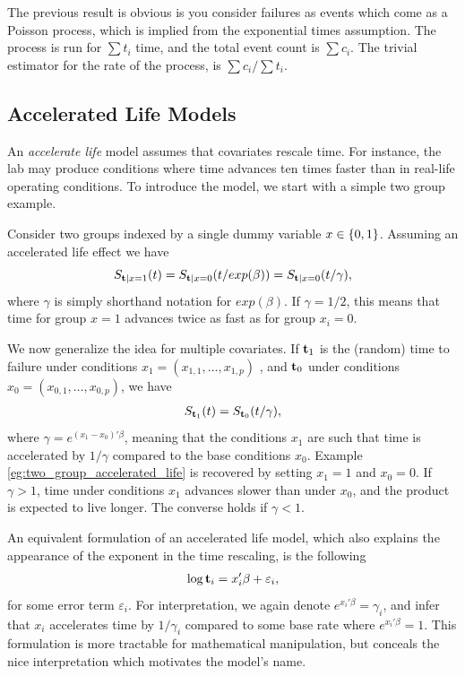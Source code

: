 \begin{extra}
The previous result is obvious is you consider failures as events which come as a Poisson process, which is implied from the exponential times assumption. 
The process is run for $\sum t_i$ time, and the total event count is $\sum c_i$. 
The trivial estimator for the rate of the process, is $\sum c_i/\sum t_i$.
\end{extra}






\subsection{Accelerated Life Models}
An \emph{accelerate life} model assumes that covariates rescale time. 
For instance, the lab may produce conditions where time advances ten times faster than in real-life operating conditions.
To introduce the model, we start with a simple two group example.
\begin{example}
\label{eg:two_group_accelerated_life}
Consider two groups indexed by a single dummy variable $x \in \{ 0,1 \}$.
Assuming an accelerated life effect we have
$$
	S_{\mathbf{t}|x=1} (t) = S_{\mathbf{t}|x = 0} (t/exp(\beta)) = S_{\mathbf{t}|x = 0} (t/\gamma), 
$$
where $\gamma$ is simply shorthand notation for $exp(\beta)$. 
If $\gamma=1/2$, this means that time for group $x=1$ advances twice as fast as for group $x_i=0$.
\end{example}

We now generalize the idea for multiple covariates.
If $\mathbf{t}_1$ is the (random) time to failure under conditions $x_1=(x_{1,1},\dots,x_{1,p})$ , and $\mathbf{t}_0$ under conditions $x_0=(x_{0,1},\dots,x_{0,p})$, we have
\begin{align}
\label{eq:accelerated_life}
	S_{\mathbf{t}_1} (t)=S_{\mathbf{t}_0} (t/\gamma),
\end{align}
where $\gamma= e^{(x_1-x_0)' \beta}$, meaning that the conditions $x_1$ are such that time is accelerated by $1/\gamma$ compared to the base conditions $x_0$.
Example \ref{eg:two_group_accelerated_life} is recovered by setting $x_1=1$ and $x_0=0$. 
If $\gamma>1$, time under conditions $x_1$ advances slower than under $x_0$, and the product is expected to live longer. 
The converse holds if $\gamma<1$.


An equivalent formulation of an accelerated life model, which also explains the appearance of the exponent in the time rescaling, is the following 
\begin{align}
\label{eq:estimating_accelerated_life}
	\log \mathbf{t}_i = x_i'\beta + \varepsilon_i,
\end{align}
for some error term $\varepsilon_i$. 
For interpretation, we again denote $e^{x_i'\beta}= \gamma_i$, and infer that $x_i$ accelerates time by $1/\gamma_i$ compared to some base rate where $e^{x_i'\beta}= 1$.
This formulation is more tractable for mathematical manipulation, but conceals the nice interpretation which motivates the model's name.

